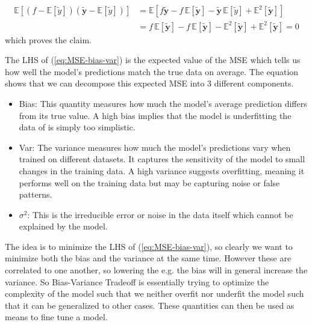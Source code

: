 \documentclass{article}
\begin{document}
	\begin{align*}
		\mathbb{E}[(f-\mathbb{E}[\tilde y])(\tilde{\bm y}-\mathbb{E}[\tilde y])]&=\mathbb{E}[f\tilde{\bm y}-f\,\mathbb{E}[\tilde{\bm y}]-\tilde{\bm y}\,\mathbb{E}[\tilde y]+\mathbb{E}^2[\tilde{\bm y}]]\\
		&=f\,\mathbb{E}[\tilde{\bm y}]-f\,\mathbb{E}[\tilde{\bm y}]-\mathbb{E}^2[\tilde{\bm y}]+\mathbb{E}^2[\tilde{\bm y}]=0
	\end{align*}
	which proves the claim. 
	
	The LHS of (\ref{eq:MSE-bias-var}) is the expected value of the MSE which tells us how well the model's predictions match the true data on average. The equation shows that we can decompose this expected MSE into 3 different components.
	\begin{itemize}
		\item Bias: This quantity measures how much the model's average prediction differs from its true value. A high bias implies that the model is underfitting the data of is simply too simplistic.
		\item Var: The variance measures how much the model's predictions vary when trained on different datasets. It captures the sensitivity of the model to small changes in the training data. A high variance suggests overfitting, meaning it performs well on the training data but may be capturing noise or false patterns.
		\item $\sigma^2$: This is the irreducible error or noise in the data itself which cannot be explained by the model.
	\end{itemize}
	The idea is to minimize the LHS of (\ref{eq:MSE-bias-var}), so clearly we want to minimize both the bias and the variance at the same time. However these are correlated to one another, so lowering the e.g. the bias will in general increase the variance. So Bias-Variance Tradeoff is essentially trying to optimize the complexity of the model such that we neither overfit nor underfit the model such that it can be generalized to other cases. These quantities can then be used as means to fine tune a model.
	
\end{document}
